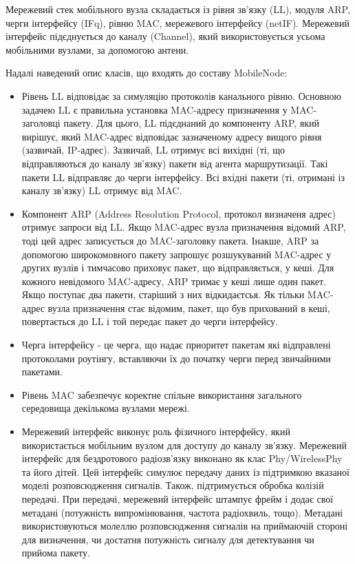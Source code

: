 \documentclass[a4paper,ukrainian,utf8,nocolumnsxix,floatsection,equationsection]{eskdtext}
\begin{document}

Мережевий стек мобільного вузла складається із рівня зв’язку (LL), модуля ARP, черги інтерфейсу (IFq), рівню MAC, мережевого інтерфейсу (netIF). Мережевий інтерфейс підєднується до каналу (Channel), який використовується усьома мобільними вузлами, за допомогою антени.

Надалі наведений опис класів, що входять до составу MobileNode:

\begin{itemize}
	\item Рівень LL відповідає за симуляцію протоколів канального рівню. Основною задачею LL є правильна установка MAC-адресу призначення у MAC-заголовці пакету. Для цього, LL підєднаний до компоненту ARP, який вирішує, який MAC-адрес відповідає зазначеному адресу вищого рівня (зазвичай, IP-адрес). Зазвичай, LL отримує всі вихідні (ті, що відправляються до каналу зв’язку) пакети від агента маршрутизації. Такі пакети LL відправляє до черги інтерфейсу. Всі вхідні пакети (ті, отримані із каналу зв’язку) LL отримує від MAC.

	\item Компонент ARP (Address Resolution Protocol, протокол визначеня адрес) отримує запроси від LL. Якщо MAC-адрес вузла призначення відомий ARP, тоді цей адрес записується до MAC-заголовку пакета. Інакше, ARP за допомогою широкомовного пакету запрошує розшукуваний MAC-адрес у других вузлів і тимчасово приховує пакет, що відправляється, у кеші. Для кожного невідомого MAC-адресу, ARP тримає у кеші лише один пакет. Якщо поступає два пакети, старіший з них відкидаєтсья. Як тільки MAC-адрес вузла призначення стає відомим, пакет, що був прихований в кеші, повертається до LL і той передає пакет до черги інтерфейсу.

	\item Черга інтерфейсу - це черга, що надає приоритет пакетам які відправлені протоколами роутінгу, вставляючи їх до початку черги перед звичайними пакетами.

	\item Рівень MAC забезпечує коректне спільне використання загального середовища декількома вузлами мережі. 

	\item Мережевий інтерфейс виконує роль фізичного інтерфейсу, який використається мобільним вузлом для доступу до каналу зв’язку. Мережевий інтерфейс для бездротового радіозв’язку виконано як клас Phy/WirelessPhy та його дітей. Цей інтерфейс симулює передачу даних із підтримкою вказаної моделі розповсюдження сигналів. Також, підтримується обробка колізій передачі. При передачі, мережевий інтерфейс штампує фрейм і додає свої метадані (потужність випромінювання, частота радіохвиль, тощо). Метадані використовуються молеллю розповсюдження сигналів на приймаючій стороні для визначення, чи достатня потужність сигналу для детектування чи прийома пакету.


\end{itemize}
\end{document}
